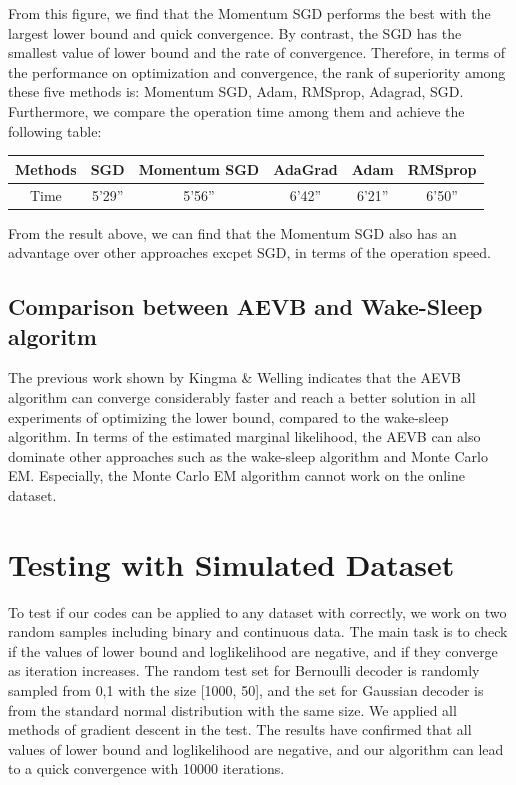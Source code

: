 \documentclass[11pt]{article}
\begin{document}
From this figure, we find that the Momentum SGD performs the best with the largest lower bound and quick convergence. By contrast, the SGD has the smallest value of lower bound and the rate of convergence. Therefore, in terms of the performance on optimization and convergence, the rank of superiority among these five methods is: Momentum SGD, Adam, RMSprop, Adagrad, SGD. Furthermore, we compare the operation time among them and achieve the following table:

\begin{table}[H]
\begin{center}
\begin{tabular}{cccccc} \hline
\hline
Methods & SGD & Momentum SGD & AdaGrad & Adam & RMSprop\\
\hline
Time & 5'29''& 5'56'' & 6'42'' & 6'21'' & 6'50''\\
\hline
\end{tabular}
\end{center}
\end{table}

From the result above, we can find that the Momentum SGD also has an advantage over other approaches excpet SGD, in terms of the operation speed.

\subsection{Comparison between AEVB and Wake-Sleep algoritm}
The previous work shown by Kingma \& Welling indicates that the AEVB algorithm can converge considerably faster and reach a better solution in all experiments of optimizing the lower bound, compared to the wake-sleep algorithm. In terms of the estimated marginal likelihood, the AEVB can also dominate other approaches such as the wake-sleep algorithm and Monte Carlo EM. Especially, the Monte Carlo EM algorithm cannot work on the online dataset. 

\section{Testing with Simulated Dataset}
To test if our codes can be applied to any dataset with correctly, we work on two random samples including binary and continuous data. The main task is to check if the values of lower bound and loglikelihood are negative, and if they converge as iteration increases. The random test set for Bernoulli decoder is randomly sampled from {0,1} with the size [1000, 50], and the set for Gaussian decoder is from the standard normal distribution with the same size. We applied all methods of gradient descent in the test. The results have confirmed that all values of lower bound and loglikelihood are negative, and our algorithm can lead to a quick convergence with 10000 iterations. 
\end{document}
